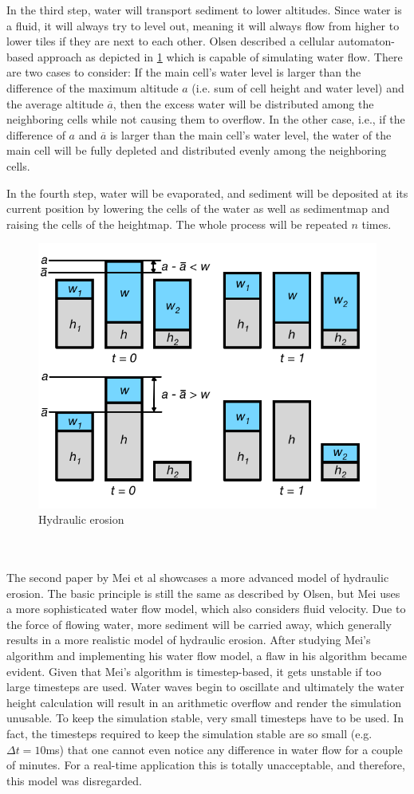 \documentclass[11pt,a4paper,twoside,openright]{report}
\begin{document}
In the third step, water will transport sediment to lower altitudes. Since water is a fluid, it will always try to level out, meaning it will always flow from higher to lower tiles if they are next to each other. Olsen described a cellular automaton-based approach as depicted in \cref{fig:hydrolicerosion} which is capable of simulating water flow. There are two cases to consider: If the main cell's water level is larger than the difference of the maximum altitude $a$ (i.e. sum of cell height and water level) and the average altitude $\overline{a}$, then the excess water will be distributed among the neighboring cells while not causing them to overflow. In the other case, i.e., if the difference of $a$ and $\overline{a}$ is larger than the main cell's water level, the water of the main cell will be fully depleted and distributed evenly among the neighboring cells.

In the fourth step, water will be evaporated, and sediment will be deposited at its current position by lowering the cells of the water as well as sedimentmap and raising the cells of the heightmap. The whole process will be repeated $n$ times.
\begin{figure}[h]
\centering
\includegraphics[width=0.65\linewidth]{hydraulicerosion.png}
\caption{Hydraulic erosion}\label{fig:hydrolicerosion}
\end{figure}
\\
\\
The second paper \cite{mei:inria-00402079} by Mei et al showcases a more advanced model of hydraulic erosion. The basic principle is still the same as described by Olsen, but Mei uses a more sophisticated water flow model, which also considers fluid velocity. Due to the force of flowing water, more sediment will be carried away, which generally results in a more realistic model of hydraulic erosion. After studying Mei's algorithm and implementing his water flow model, a flaw in his algorithm became evident. Given that Mei's algorithm is timestep-based, it gets unstable if too large timesteps are used. Water waves begin to oscillate and ultimately the water height calculation will result in an arithmetic overflow and render the simulation unusable. To keep the simulation stable, very small timesteps have to be used. In fact, the timesteps required to keep the simulation stable are so small (e.g. $\Delta t = 10$ms) that one cannot even notice any difference in water flow for a couple of minutes. For a real-time application this is totally unacceptable, and therefore, this model was disregarded.
\end{document}
